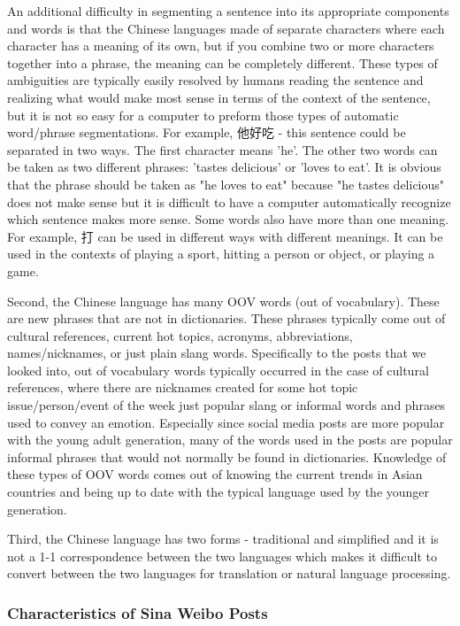 \documentclass[11pt]{article}
\newcommand{\1}[1]{{\mathbf 1}\left\{#1\right\}}        %
\begin{document}
An additional difficulty in segmenting a sentence into its appropriate components and words is that the Chinese languages made of separate characters where each character has a meaning of its own, but if you combine two or more characters together into a phrase, the meaning can be completely different. These types of ambiguities are typically easily resolved by humans reading the sentence and realizing what would make most sense in terms of the context of the
sentence, but it is not so easy for a computer to preform those types of automatic word/phrase segmentations. For example, 他好吃 - this sentence could be separated in two ways. The first character means 'he'. The other two words can be taken as two different phrases: 'tastes delicious' or 'loves to eat'.  It is obvious that the phrase should be taken as "he loves to eat" because "he tastes delicious" does not make sense but it is difficult to have a computer
automatically recognize which sentence makes more sense. Some words also have more than one meaning. For example, 打 can be used in different ways with different meanings. It can be used in the contexts of playing a sport, hitting a person or object, or playing a game. 

Second, the Chinese language has many OOV words (out of vocabulary).  These are new phrases that are not in dictionaries.  These phrases typically come out of cultural references, current hot topics, acronyms, abbreviations, names/nicknames, or just plain slang words.  Specifically to the posts that we looked into, out of vocabulary words typically occurred in the case of cultural references, where there are nicknames created for some hot topic issue/person/event of the week just popular slang or informal words and phrases used to 
convey an emotion.  Especially since social media posts are more popular with the young adult generation, many of the words used in the posts are popular informal phrases that would not normally be found in dictionaries. Knowledge of these types of OOV words comes out of knowing the current trends in Asian countries and being up to date with the typical language used by the younger generation.  

Third, the Chinese language has two forms - traditional and simplified and it is not a 1-1 correspondence between the two languages which makes it difficult to convert between the two languages for translation or natural language processing. 



\subsubsection{Characteristics of Sina Weibo Posts}\label{subsec:Weibo}
\end{document}
